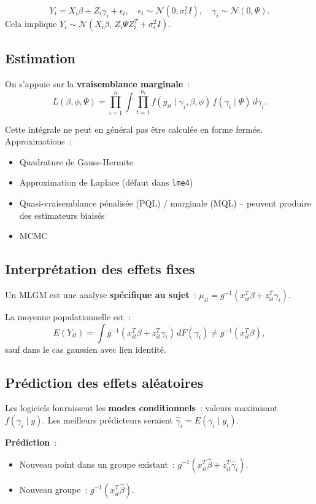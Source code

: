 \documentclass[11pt,letterpaper]{article}
\begin{document}
$$Y_i = X_i\beta + Z_i\gamma_i + \epsilon_i, \quad \epsilon_i \sim \mathcal{N}(0,\sigma^2_\epsilon I), \quad \gamma_i \sim \mathcal{N}(0,\Psi).$$
Cela implique $Y_i \sim \mathcal{N}(X_i\beta,\, Z_i\Psi Z_i^T + \sigma^2_\epsilon I)$.

\subsection{Estimation}

On s'appuie sur la \textbf{vraisemblance marginale}~:
$$L(\beta,\phi,\Psi) = \prod_{i=1}^n \int \prod_{t=1}^{n_i} f(y_{it} \mid \gamma_i,\beta,\phi)\, f(\gamma_i \mid \Psi)\, d\gamma_i.$$

Cette intégrale ne peut en général pas être calculée en forme fermée. Approximations~:
\begin{itemize}
\item Quadrature de Gauss-Hermite
\item Approximation de Laplace (défaut dans \texttt{lme4})
\item Quasi-vraisemblance pénalisée (PQL) / marginale (MQL) -- peuvent produire des estimateurs biaisés
\item MCMC
\end{itemize}

\subsection{Interprétation des effets fixes}

Un MLGM est une analyse \textbf{spécifique au sujet}~: $\mu_{it} = g^{-1}(x_{it}^T\beta + z_{it}^T\gamma_i)$.

La moyenne populationnelle est~:
$$E(Y_{it}) = \int g^{-1}(x_{it}^T\beta + z_{it}^T\gamma_i)\,dF(\gamma_i) \neq g^{-1}(x_{it}^T\beta),$$
sauf dans le cas gaussien avec lien identité.

\subsection{Prédiction des effets aléatoires}

Les logiciels fournissent les \textbf{modes conditionnels}~: valeurs maximisant $f(\gamma_i \mid y)$. Les meilleurs prédicteurs seraient $\hat{\gamma}_i = E(\gamma_i \mid y_i)$.

\textbf{Prédiction}~:
\begin{itemize}
\item Nouveau point dans un groupe existant~: $g^{-1}(x_{it}^T\hat{\beta} + z_{it}^T\hat{\gamma}_i)$.
\item Nouveau groupe~: $g^{-1}(x_{it}^T\hat{\beta})$.
\end{itemize}
\end{document}

